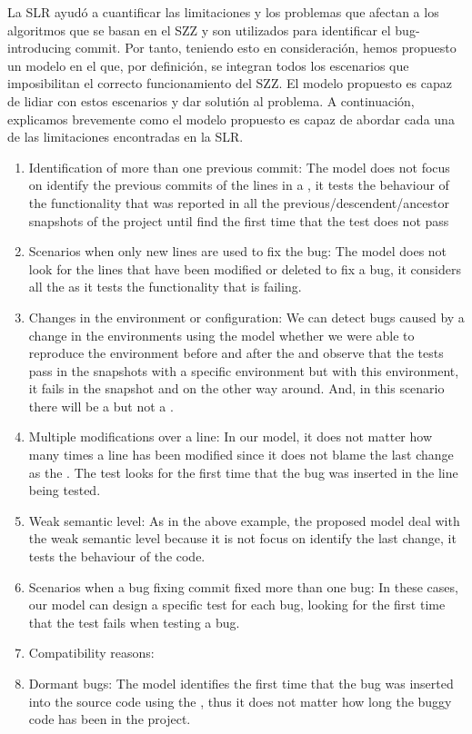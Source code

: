 \documentclass[a4paper, 12pt]{book}
\begin{document}
La SLR ayud\'o a cuantificar las limitaciones y los problemas que afectan a los algoritmos que se basan en el SZZ y son utilizados para identificar el bug-introducing commit. Por tanto, teniendo esto en consideraci\'on, hemos propuesto un modelo en el que, por definici\'on, se integran todos los escenarios que imposibilitan el correcto funcionamiento del SZZ. El modelo propuesto es capaz de lidiar con estos escenarios y dar soluti\'on al problema. A continuaci\'on, explicamos brevemente como el modelo propuesto es capaz de abordar cada una de las limitaciones encontradas en la SLR. 	\begin{enumerate}   
		\item Identification of more than one previous commit: The model does not focus on identify the previous commits of the lines in a \BFC, it tests the behaviour of the functionality that was reported in all the previous/descendent/ancestor snapshots of the project until find the first time that the test does not pass
		\item Scenarios when only new lines are used to fix the bug: The model does not look for the lines that have been modified or deleted to fix a bug, it considers all the \BFC as it tests the functionality that is failing.
		\item Changes in the environment or configuration: We can detect bugs caused by a change in the environments using the model whether we were able to reproduce the environment before and after the \BFC and observe that the tests pass in the snapshots with a specific environment but with this environment, it fails in the \BFC snapshot and on the other way around. And, in this scenario there will be a \FFC but not a \BIC.
		\item Multiple modifications over a line: In our model, it does not matter how many times a line has been modified since it does not blame the last change as the \BIC. The test looks for the first time that the bug was inserted in the line being tested.
		\item Weak semantic level: As in the above example, the proposed model deal with the weak semantic level because it is not focus on identify the last change, it tests the behaviour of the code.
		\item Scenarios when a bug fixing commit fixed more than one bug: In these cases, our model can design a specific test for each bug, looking for the first time that the test fails when testing a bug.
		\item Compatibility reasons: 
		\item Dormant bugs: The model identifies the first time that the bug was inserted into the source code using the \TSB, thus it does not matter how long the buggy code has been in the project.
	\end{enumerate}
\end{document}
